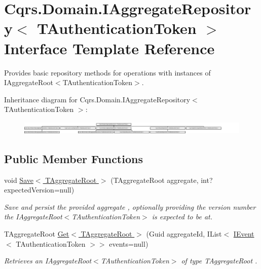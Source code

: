 \hypertarget{interfaceCqrs_1_1Domain_1_1IAggregateRepository}{}\section{Cqrs.\+Domain.\+I\+Aggregate\+Repository$<$ T\+Authentication\+Token $>$ Interface Template Reference}
\label{interfaceCqrs_1_1Domain_1_1IAggregateRepository}


Provides basic repository methods for operations with instances of I\+Aggregate\+Root$<$\+T\+Authentication\+Token$>$.  


Inheritance diagram for Cqrs.\+Domain.\+I\+Aggregate\+Repository$<$ T\+Authentication\+Token $>$\+:\begin{figure}[H]
\begin{center}
\leavevmode
\includegraphics[height=0.661939cm]{interfaceCqrs_1_1Domain_1_1IAggregateRepository}
\end{center}
\end{figure}
\subsection*{Public Member Functions}
\begin{DoxyCompactItemize}
\item 
void \hyperlink{interfaceCqrs_1_1Domain_1_1IAggregateRepository_a306baf8aa6faabe893f93e5db5d3517d_a306baf8aa6faabe893f93e5db5d3517d}{Save$<$ T\+Aggregate\+Root $>$} (T\+Aggregate\+Root aggregate, int? expected\+Version=null)
\begin{DoxyCompactList}\small\item\em Save and persist the provided {\itshape aggregate} , optionally providing the version number the I\+Aggregate\+Root$<$\+T\+Authentication\+Token$>$ is expected to be at. \end{DoxyCompactList}\item 
T\+Aggregate\+Root \hyperlink{interfaceCqrs_1_1Domain_1_1IAggregateRepository_a890633fddbd05bd3b9e9968a2de095bb_a890633fddbd05bd3b9e9968a2de095bb}{Get$<$ T\+Aggregate\+Root $>$} (Guid aggregate\+Id, I\+List$<$ \hyperlink{interfaceCqrs_1_1Events_1_1IEvent}{I\+Event}$<$ T\+Authentication\+Token $>$$>$ events=null)
\begin{DoxyCompactList}\small\item\em Retrieves an I\+Aggregate\+Root$<$\+T\+Authentication\+Token$>$ of type {\itshape T\+Aggregate\+Root} . \end{DoxyCompactList}\end{DoxyCompactItemize}


